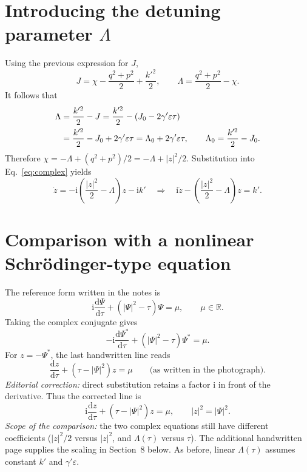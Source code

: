 \documentclass[11pt,a4paper]{article}
\newcommand{\dd}{\mathrm{d}}
\begin{document}
\section{Introducing the detuning parameter $\Lambda$}
Using the previous expression for $J$,
\begin{equation}
J=\chi-\frac{q^2+p^2}{2}+\frac{k'^2}{2},
\qquad \Lambda=\frac{q^2+p^2}{2}-\chi.
\end{equation}
It follows that
\begin{align}
\Lambda
&=\frac{k'^2}{2}-J
=\frac{k'^2}{2}-(J_0-2\gamma'\varepsilon\tau)\notag\\
&=\frac{k'^2}{2}-J_0+2\gamma'\varepsilon\tau
=\Lambda_0+2\gamma'\varepsilon\tau,
\qquad \Lambda_0=\frac{k'^2}{2}-J_0.
\end{align}
Therefore $\chi=-\Lambda+(q^2+p^2)/2=-\Lambda+|z|^2/2$.
Substitution into Eq.~\eqref{eq:complex} yields
\begin{equation}
\dot z=-\mathrm{i}\left(\frac{|z|^2}{2}-\Lambda\right)z
-\mathrm{i}k'
\quad\Longrightarrow\quad
\boxed{\mathrm{i}\dot z-\left(\frac{|z|^2}{2}-\Lambda\right)z=k'.}
\end{equation}

\section{Comparison with a nonlinear Schr\"odinger-type equation}
The reference form written in the notes is
\begin{equation}
\mathrm{i}\frac{\dd\Psi}{\dd\tau}+(|\Psi|^2-\tau)\Psi=\mu,
\qquad \mu\in\mathbb{R}.
\end{equation}
Taking the complex conjugate gives
\begin{equation}
-\mathrm{i}\frac{\dd\Psi^*}{\dd\tau}
+(|\Psi|^2-\tau)\Psi^*=\mu.
\end{equation}
For $z=-\Psi^*$, the last handwritten line reads
\begin{equation}
\frac{\dd z}{\dd\tau}+(\tau-|\Psi|^2)z=\mu
\qquad\text{(as written in the photograph).}
\end{equation}
\textit{Editorial correction:} direct substitution retains a factor
$\mathrm{i}$ in front of the derivative. Thus the corrected line is
\begin{equation}
\boxed{\mathrm{i}\frac{\dd z}{\dd\tau}+(\tau-|\Psi|^2)z=\mu,
\qquad |z|^2=|\Psi|^2.}
\end{equation}
\textit{Scope of the comparison:} the two complex equations still have
different coefficients ($|z|^2/2$ versus $|z|^2$, and $\Lambda(\tau)$ versus
$\tau$). The additional handwritten page supplies the scaling in
Section~8 below. As before, linear $\Lambda(\tau)$ assumes
constant $k'$ and $\gamma'\varepsilon$.
\newpage
\end{document}
